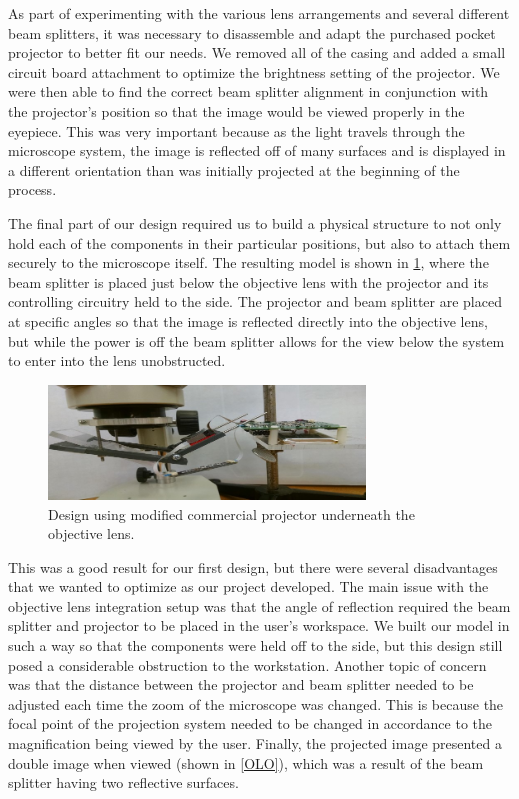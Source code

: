\documentclass[12pt,a4paper]{article}
\begin{document}
\begin{appendices}
As part of experimenting with the various lens arrangements and several different beam splitters, it was necessary to disassemble and adapt the purchased pocket projector to better fit our needs.  We removed all of the casing and added a small circuit board attachment to optimize the brightness setting of the projector.  We were then able to find the correct beam splitter alignment in conjunction with the projector’s position so that the image would be viewed properly in the eyepiece.  This was very important because as the light travels through the microscope system, the image is reflected off of many surfaces and is displayed in a different orientation than was initially projected at the beginning of the process.

The final part of our design required us to build a physical structure to not only hold each of the components in their particular positions, but also to attach them securely to the microscope itself.  The resulting model is shown in \ref{OLS}, where the beam splitter is placed just below the objective lens with the projector and its controlling circuitry held to the side.  The projector and beam splitter are placed at specific angles so that the image is reflected directly into the objective lens, but while the power is off the beam splitter allows for the view below the system to enter into the lens unobstructed.

\begin{figure}[h]
	\centering
	\includegraphics[width = 0.75\textwidth]{pics/objective_lens_setup.jpg}
	\caption[Objective Lens Setup]{\centering Design using modified commercial projector underneath the objective lens.}
	\label{OLS}
\end{figure}


This was a good result for our first design, but there were several disadvantages that we wanted to optimize as our project developed.  The main issue with the objective lens integration setup was that the angle of reflection required the beam splitter and projector to be placed in the user’s workspace.  We built our model in such a way so that the components were held off to the side, but this design still posed a considerable obstruction to the workstation.  Another topic of concern was that the distance between the projector and beam splitter needed to be adjusted each time the zoom of the microscope was changed.  This is because the focal point of the projection system needed to be changed in accordance to the magnification being viewed by the user.  Finally, the projected image presented a double image when viewed (shown in \ref{OLO}), which was a result of the beam splitter having two reflective surfaces.


\end{appendices}
\end{document}
